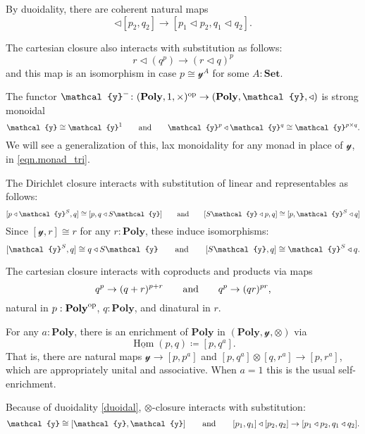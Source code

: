 \documentclass[11pt, one side, article]{memoir}
\theoremstyle{definition}
\theoremstyle{plain}
\DeclareMathOperator{\Hom}{Hom}
\newcommand{\Cat}[1]{\mathbf{#1}}%
\newcommand{\op}{^\tn{op}}
\newcommand{\tn}[1]{\textnormal{#1}}
\newcommand{\ul}[1]{\underline{#1}}
\newcommand{\smset}{\Cat{Set}}
\newcommand{\yon}{{\mathcal{y}}}
\newcommand{\poly}{\Cat{Poly}}
\newcommand{\0}{\textsf{0}}
\newcommand{\1}{\tn{\textsf{1}}}
\newcommand{\tri}{\mathbin{\triangleleft}}
\newcommand{\hh}[2][]{#1 \tn{#2} #1}
\newcommand{\qqand}{\hh[\qquad]{and}}
\begin{document}
By duoidality, there are coherent natural maps
\begin{equation}
	[p_1,q_1]\tri[p_2,q_2]\to[p_1\tri p_2,q_1\tri q_2].
\end{equation}

The cartesian closure also interacts with substitution as follows:
\begin{equation}
	r\tri (q^p)\to (r\tri q)^p
\end{equation}
and this map is an isomorphism in case $p\cong\yon^A$ for some $A:\smset$. 

The functor $\yon^-\colon(\poly,1,\times)\op\to(\poly,\yon,\tri)$ is strong monoidal
\begin{equation}
	\yon\cong\yon^1
	\qqand
	\yon^p\tri\yon^q\cong\yon^{p\times q}.
\end{equation}
We will see a generalization of this, lax monoidality for any monad in place of $\yon$, in \eqref{eqn.monad_tri}.

The Dirichlet closure interacts with substitution of linear and representables as follows:
\begin{equation}\label{eqn.innerhom_adj}
  [p\tri \yon^S,q]\cong[p,q\tri S\yon]
  \qqand
  [S\yon\tri p,q]\cong[p,\yon^S\tri q]
\end{equation}
Since $[\yon,r]\cong r$ for any $r:\poly$, these induce isomorphisms:
\begin{equation}\label{eqn.closure_lin_rep}
	[\yon^S,q]\cong q\tri S\yon
	\qqand
	[S\yon,q]\cong\yon^S\tri q.
\end{equation} 

The cartesian closure interacts with coproducts and products via maps
\begin{equation}
  q^p\to(q+r)^{p+r}
  \qqand
	q^p\to(qr)^{pr},
\end{equation}
natural in $p:\poly\op$, $q:\poly$, and dinatural in $r$.

For any $a:\poly$, there is an enrichment of $\poly$ in $(\poly,\yon,\otimes)$ via
\begin{equation}
	\ul\Hom(p,q)\coloneqq[p,q^a].
\end{equation}
That is, there are natural maps $\yon\to[p,p^a]$ and $[p,q^a]\otimes[q,r^a]\to[p,r^a]$, which are appropriately unital and associative. When $a=1$ this is the usual self-enrichment.


Because of duoidality \eqref{duoidal}, $\otimes$-closure interacts with substitution:
\begin{equation}\label{eqn.shapiro_1}
	\yon\cong[\yon,\yon]
	\qqand
	[p_1,q_1]\tri[p_2,q_2]\to [p_1\tri p_2,q_1\tri q_2].
\end{equation}
\end{document}
